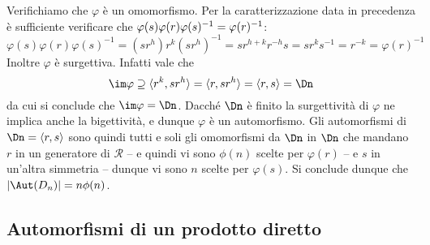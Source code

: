 \documentclass[11pt]{scrartcl}
\begin{document}
	
	Verifichiamo che $\varphi$ è un omomorfismo. Per la 
	caratterizzazione data in precedenza è sufficiente verificare che
	$\varphi(s)\varphi(r)\varphi(s)^{-1} = \nolinebreak\varphi(r)^{-1}$:
	\[
	\varphi(s)\varphi(r)\varphi(s)^{-1} = (sr^h)r^k(sr^h)^{-1} = sr^{h + k}r^{-h}s =
	sr^k s^{-1} = r^{-k} = \varphi(r)^{-1}
	\]
	Inoltre $\varphi$ è surgettiva. Infatti vale che
	\[
	\im \varphi \supseteq \langle r^k, sr^h \rangle = \langle r, sr^h \rangle = \langle r, s \rangle =
	\Dn
	\]
	da cui si conclude che $\im \varphi = \Dn$. Dacché $\Dn$ è finito la surgettività di $\varphi$ ne implica anche la bigettività, e dunque $\varphi$
	è un automorfismo. Gli automorfismi di $\Dn = \langle r, s\rangle$ sono quindi
	tutti e soli gli omomorfismi da $\Dn$ in $\Dn$ che mandano $r$ in un generatore
	di $\mathcal{R}$ -- e quindi vi sono $\phi(n)$ scelte per $\varphi(r)$ -- e $s$ in un'altra simmetria -- dunque vi sono $n$ scelte per $\varphi(s)$. Si conclude dunque che
	$\lvert \Aut(D_n) \rvert = n\phi(n)$.
	
	\newpage
	
	\subsection{Automorfismi di un prodotto diretto}
	
\end{document}
